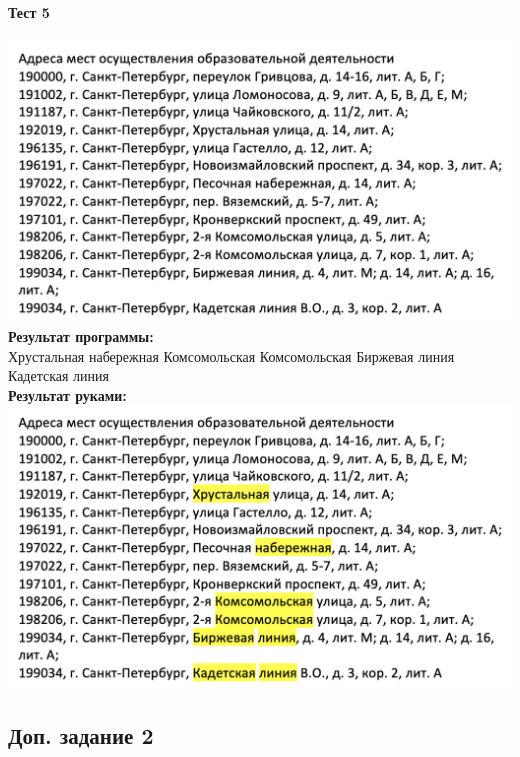 \documentclass[12pt,onecolumn]{article}
\begin{document}
\begin{flushleft}
\paragraph{Тест 5}
\hfill \break
\includegraphics[scale=0.4]{prog2/p5.png}\\
\textbf{Результат программы:}\\
Хрустальная набережная Комсомольская Комсомольская Биржевая линия Кадетская линия\\
\textbf{Результат руками:}\\
\includegraphics[scale=0.4]{prog2/p5+.png}\\
\subsection{Доп. задание 2}

\end{flushleft}
\end{document}

